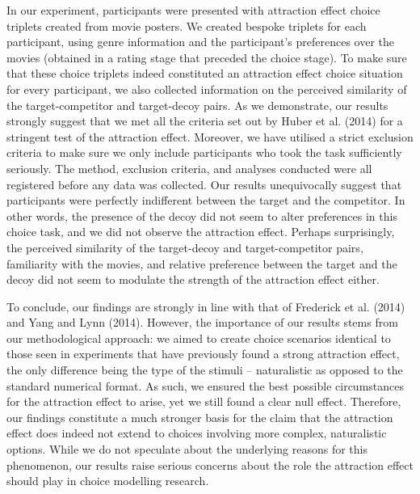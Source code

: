 \documentclass[12pt, a4paper]{article}
\begin{document}
In our experiment, participants were presented with attraction effect choice triplets created from movie posters. We created bespoke triplets for each participant, using genre information and the participant’s preferences over the movies (obtained in a rating stage that preceded the choice stage). To make sure that these choice triplets indeed constituted an attraction effect choice situation for every participant, we also collected information on the perceived similarity of the target-competitor and target-decoy pairs. As we demonstrate, our results strongly suggest that we met all the criteria set out by Huber et al. (2014) for a stringent test of the attraction effect. Moreover, we have utilised a strict exclusion criteria to make sure we only include participants who took the task sufficiently seriously. The method, exclusion criteria, and analyses conducted were all registered before any data was collected.
Our results unequivocally suggest that participants were perfectly indifferent between the target and the competitor. In other words, the presence of the decoy did not seem to alter preferences in this choice task, and we did not observe the attraction effect. Perhaps surprisingly, the perceived similarity of the target-decoy and target-competitor pairs, familiarity with the movies, and relative preference between the target and the decoy did not seem to modulate the strength of the attraction effect either.


To conclude, our findings are strongly in line with that of Frederick et al. (2014) and Yang and Lynn (2014). However, the importance of our results stems from our methodological approach: we aimed to create choice scenarios identical to those seen in experiments that have previously found a strong attraction effect, the only difference being the type of the stimuli – naturalistic as opposed to the standard numerical format. As such, we ensured the best possible circumstances for the attraction effect to arise, yet we still found a clear null effect. Therefore, our findings constitute a much stronger basis for the claim that the attraction effect does indeed not extend to choices involving more complex, naturalistic options. While we do not speculate about the underlying reasons for this phenomenon, our results raise serious concerns about the role the attraction effect should play in choice modelling research.
\end{document}
